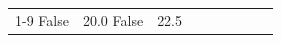 \begin{table}[H]
\begin{tabular}{lllrlllll}
\cline{1-9}
False & 20.0%
\cline{1-9}
False & 22.5%

\end{tabular}
\end{table}

